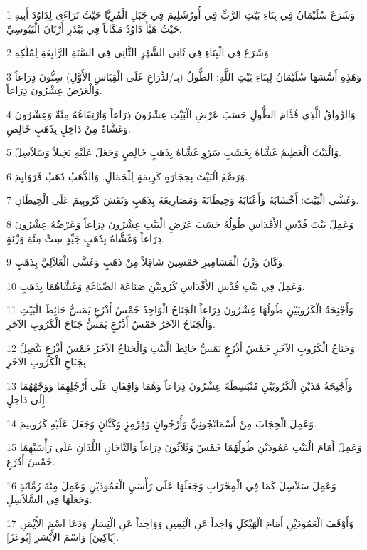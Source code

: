 \par 1 وَشَرَعَ سُلَيْمَانُ فِي بِنَاءِ بَيْتِ الرَّبِّ فِي أُورُشَلِيمَ فِي جَبَلِ الْمُرِيَّا حَيْثُ تَرَاءَى لِدَاوُدَ أَبِيهِ حَيْثُ هَيَّأَ دَاوُدُ مَكَاناً فِي بَيْدَرِ أُرْنَانَ الْيَبُوسِيِّ.
\par 2 وَشَرَعَ فِي الْبِنَاءِ فِي ثَانِي الشَّهْرِ الثَّانِي فِي السَّنَةِ الرَّابِعَةِ لِمُلْكِهِ.
\par 3 وَهَذِهِ أَسَّسَهَا سُلَيْمَانُ لِبِنَاءِ بَيْتِ اللَّهِ: الطُّولُ (بِـ/لذِّرَاعِ عَلَى الْقِيَاسِ الأَوَّلِ) سِتُّونَ ذِرَاعاً وَالْعَرْضُ عِشْرُون ذِرَاعاً.
\par 4 وَالرِّواقُ الَّذِي قُدَّامَ الطُّولِ حَسَبَ عَرْضِ الْبَيْتِ عِشْرُونَ ذِرَاعاً وَارْتِفَاعُهُ مِئَةٌ وَعِشْرُونَ وَغَشَّاهُ مِنْ دَاخِلٍ بِذَهَبٍ خَالِصٍ.
\par 5 وَالْبَيْتُ الْعَظِيمُ غَشَّاهُ بِخَشَبِ سَرْوٍ غَشَّاهُ بِذَهَبٍ خَالِصٍ وَجَعَلَ عَلَيْهِ نَخِيلاً وَسَلاَسِلَ.
\par 6 وَرَصَّعَ الْبَيْتَ بِحِجَارَةٍ كَرِيمَةٍ لِلْجَمَالِ. وَالذَّهَبُ ذَهَبُ فَرَوَايِمَ.
\par 7 وَغَشَّى الْبَيْتَ: أَخْشَابَهُ وَأَعْتَابَهُ وَحِيطَانَهُ وَمَصَارِيعَهُ بِذَهَبٍ وَنَقَشَ كَرُوبِيمَ عَلَى الْحِيطَانِ.
\par 8 وَعَمِلَ بَيْتَ قُدْسِ الأَقْدَاسِ طُولُهُ حَسَبَ عَرْضِ الْبَيْتِ عِشْرُونَ ذِرَاعاً وَعَرْضُهُ عِشْرُونَ ذِرَاعاً وَغَشَّاهُ بِذَهَبٍ جَيِّدٍ سِتِّ مِئَةِ وَزْنَةٍ.
\par 9 وَكَانَ وَزْنُ الْمَسَامِيرِ خَمْسِينَ شَاقِلاً مِنْ ذَهَبٍ وَغَشَّى الْعَلاَلِيَّ بِذَهَبٍ.
\par 10 وَعَمِلَ فِي بَيْتِ قُدْسِ الأَقْدَاسِ كَرُوبَيْنِ صَنَاعَةَ الصِّيَاغَةِ وَغَشَّاهُمَا بِذَهَبٍ.
\par 11 وَأَجْنِحَةُ الْكَرُوبَيْنِ طُولُهَا عِشْرُونَ ذِرَاعاً الْجَنَاحُ الْوَاحِدُ خَمْسُ أَذْرُعٍ يَمَسُّ حَائِطَ الْبَيْتِ وَالْجَنَاحُ الآخَرُ خَمْسُ أَذْرُعٍ يَمَسُّ جَنَاحَ الْكَرُوبِ الآخَرِ.
\par 12 وَجَنَاحُ الْكَرُوبِ الآخَرِ خَمْسُ أَذْرُعٍ يَمَسُّ حَائِطَ الْبَيْتِ وَالْجَنَاحُ الآخَرُ خَمْسُ أَذْرُعٍ يَتَّصِلُ بِجَنَاحِ الْكَرُوبِ الآخَرِ.
\par 13 وَأَجْنِحَةُ هَذَيْنِ الْكَرُوبَيْنِ مُنْبَسِطَةً عِشْرُونَ ذِرَاعاً وَهُمَا وَاقِفَانِ عَلَى أَرْجُلِهِمَا وَوَجْهُهُمَا إِلَى دَاخِلٍ.
\par 14 وَعَمِلَ الْحِجَابَ مِنْ أَسْمَانْجُونِيٍّ وَأُرْجُوانٍ وَقِرْمِزٍ وَكَتَّانٍ وَجَعَلَ عَلَيْهِ كَرُوبِيمَ.
\par 15 وَعَمِلَ أَمَامَ الْبَيْتِ عَمُودَيْنِ طُولُهُمَا خَمْسٌ وَثَلاَثُونَ ذِرَاعاً وَالتَّاجَانِ اللَّذَانِ عَلَى رَأْسَيْهِمَا خَمْسُ أَذْرُعٍ.
\par 16 وَعَمِلَ سَلاَسِلَ كَمَا فِي الْمِحْرَابِ وَجَعَلَهَا عَلَى رَأْسَيِ الْعَمُودَيْنِ وَعَمِلَ مِئَةَ رُمَّانَةٍ وَجَعَلَهَا فِي السَّلاَسِلِ.
\par 17 وَأَوْقَفَ الْعَمُودَيْنِ أَمَامَ الْهَيْكَلِ وَاحِداً عَنِ الْيَمِينِ وَوَاحِداً عَنِ الْيَسَارِ وَدَعَا اسْمَ الأَيْمَنِ [يَاكِينَ] وَاسْمَ الأَيْسَرِ [بُوعَزَ].


